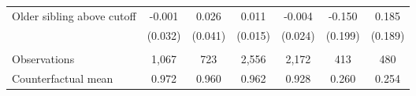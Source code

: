 {{\begin{tabular}{lcccccc}
Older sibling above cutoff&      -0.001   &       0.026   &       0.011   &      -0.004   &      -0.150   &       0.185   \\
                    &     (0.032)   &     (0.041)   &     (0.015)   &     (0.024)   &     (0.199)   &     (0.189)   \\
                    &               &               &               &               &               &               \\
Observations        &       1,067   &         723   &       2,556   &       2,172   &         413   &         480   \\
Counterfactual mean &       0.972   &       0.960   &       0.962   &       0.928   &       0.260   &       0.254   \\
 

\bottomrule
\end{tabular}
}
}
